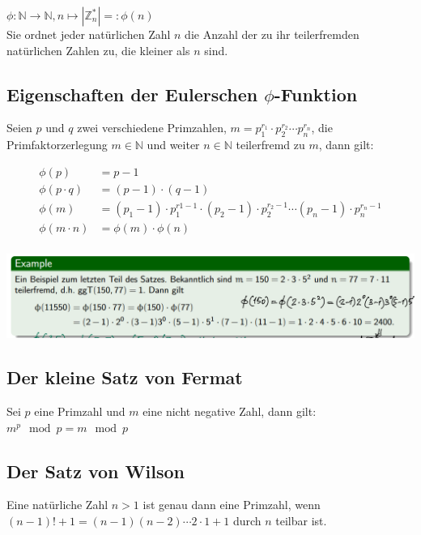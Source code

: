 \documentclass[12pt]{scrartcl}
\begin{document}
\indent
$\phi: \mathbb{N} \rightarrow \mathbb{N}, n \mapsto |\mathbb{Z}_n^*| =: \phi(n)$\\

Sie ordnet jeder natürlichen Zahl $n$ die Anzahl der zu ihr teilerfremden natürlichen Zahlen zu,
die kleiner als $n$ sind.


\subsection{Eigenschaften der Eulerschen $\phi$-Funktion}
Seien $p$ und $q$ zwei verschiedene Primzahlen, $m = p_1^{r_1} \cdot p_2^{r_2} \cdots p_n^{r_n}$,
die Primfaktorzerlegung $m \in \mathbb{N}$ und weiter $n \in \mathbb{N}$ teilerfremd zu $m$, dann gilt:

\begin{align*}
    \phi(p) &= p - 1 \\
    \phi(p \cdot q) &= (p - 1) \cdot (q - 1) \\
    \phi(m) &= (p_1 - 1) \cdot p_1^{r1-1} \cdot (p_2 - 1) \cdot p_2^{r_2 - 1} \cdots (p_n - 1) \cdot p_n^{r_n - 1} \\
    \phi(m \cdot n) &= \phi(m) \cdot \phi(n) \\
\end{align*}

\includegraphics[width=14cm]{img/example_euler_phi.png}

\newpage
\subsection{Der kleine Satz von Fermat}
Sei $p$ eine Primzahl und $m$ eine nicht negative Zahl, dann gilt:\\

$m^p \mod p = m \mod p$\\


\subsection{Der Satz von Wilson}
Eine natürliche Zahl $n > 1$ ist genau dann eine Primzahl, wenn\\
$(n-1)! + 1 = (n-1) (n-2) \cdots 2 \cdot 1 + 1$ durch $n$ teilbar ist.\\
\end{document}
